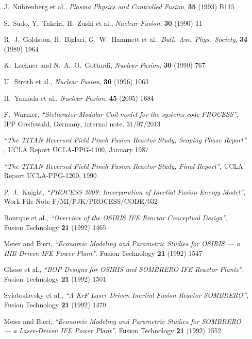 \documentclass[11pt,a4paper]{report}
\begin{document}
\begin{thebibliography}{99}
J.\ N\"{u}hrenberg et al., \textit{Plasma Physics and Controlled Fusion},
\textbf{35} (1993) B115

S.\ Sudo, Y.\ Takeiri, H.\ Zushi et al., \textit{Nuclear Fusion}, \textbf{30} (1990)
11

R.\ J.\ Goldston, H.\ Biglari, G.\ W.\ Hammett et al.,
\textit{Bull.\ Am.\ Phys.\ Society}, \textbf{34} (1989) 1964

K.\ Lackner and N.\ A.\ O.\ Gottardi,
\textit{Nuclear Fusion}, \textbf{30} (1990) 767

U.\ Stroth et al.,
\textit{Nuclear Fusion}, \textbf{36} (1996) 1063

H.\ Yamada et al.,
\textit{Nuclear Fusion}, \textbf{45} (2005) 1684

F.\ Warmer,
\textit{``Stellarator Modular Coil model for the systems code PROCESS''},
IPP Greifswald, Germany, internal note, 31/07/2013

\textit{``The TITAN Reversed Field Pinch Fusion Reactor Study, Scoping Phase
Report''} ,
UCLA Report UCLA-PPG-1100, January 1987

\textit{``The TITAN Reversed Field Pinch Fusion Reactor Study, Final Report''},
UCLA Report UCLA-PPG-1200, 1990

P.\ J.\ Knight,
\textit{``PROCESS 3009: Incorporation of Inertial Fusion Energy Model''},
Work File Note F/MI/PJK/PROCESS/CODE/032

Bourque et al.,
\textit{``Overview of the OSIRIS IFE Reactor Conceptual Design''},
Fusion Technology \textbf{21} (1992) 1465

Meier and Bieri,
\textit{``Economic Modeling and Parametric Studies for OSIRIS --- a HIB-Driven
  IFE Power Plant''},
Fusion Technology \textbf{21} (1992) 1547

Ghose et al.,
\textit{``BOP Designs for OSIRIS and SOMBRERO IFE Reactor Plants''},
Fusion Technology \textbf{21} (1992) 1501

Sviatoslavsky et al.,
\textit{``A KrF Laser Driven Inertial Fusion Reactor SOMBRERO''},
Fusion Technology \textbf{21} (1992) 1470

Meier and Bieri,
\textit{``Economic Modeling and Parametric Studies for SOMBRERO --- a Laser-Driven
  IFE Power Plant''},
Fusion Technology \textbf{21} (1992) 1552


\end{thebibliography}
\end{document}
